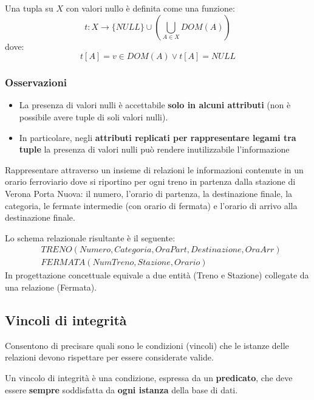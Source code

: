 \documentclass[a4paper,twoside]{article}
\begin{document}
\vspace{1em}
\noindent
\begin{definition}
  Una tupla su \( X \) con valori nullo è definita come una funzione:
  \[
    t: X \to \{NULL\} \cup \left( \bigcup_{A \in X} DOM(A) \right)
  \] 
  dove:
  \[
    t[A] = v \in DOM(A) \vee t[A] = NULL
  \] 
\end{definition}

\subsubsection{Osservazioni}
\begin{itemize}
  \item La presenza di valori nulli è accettabile \textbf{solo in alcuni attributi}
    (non è possibile avere tuple di soli valori nulli).

  \item In particolare, negli \textbf{attributi replicati per rappresentare legami tra
    tuple} la presenza di valori nulli può rendere inutilizzabile l’informazione
\end{itemize}

\begin{example}
  \label{ex:orario_ferroviario}
  Rappresentare attraverso un insieme di relazioni le
  informazioni contenute in un orario ferroviario dove si
  riportino per ogni treno in partenza dalla stazione di
  Verona Porta Nuova:
  il numero, l’orario di partenza, la destinazione finale, la categoria,
  le fermate intermedie (con orario di fermata) e l’orario di arrivo
  alla destinazione finale.

  Lo schema relazionale risultante è il seguente:
  \[
    \begin{aligned}
      &TRENO(Numero, Categoria, OraPart, Destinazione, OraArr)\\
      &FERMATA(NumTreno, Stazione, Orario)
    \end{aligned}
  \] 
  In progettazione concettuale equivale a due entità (Treno e Stazione) collegate
  da una relazione (Fermata).
\end{example}

\subsection{Vincoli di integrità}
Consentono di precisare quali sono le condizioni (vincoli) che le istanze delle relazioni
devono rispettare per essere considerate valide.
\begin{definition}
  Un vincolo di integrità è una condizione, espressa da un \textbf{predicato}, che deve
  essere \textbf{sempre} soddisfatta da \textbf{ogni istanza} della base di dati.
\end{definition}
\end{document}
